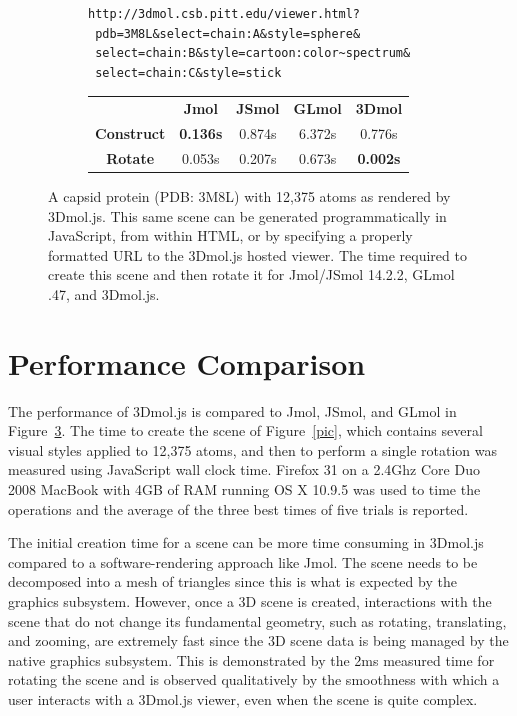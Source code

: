 \documentclass[]{bioinfo}
\begin{document}
\begin{figure}
\begin{minipage}[b]{\linewidth}
\begin{subfigure}[b]{\linewidth} \centering
\begin{verbatim}
http://3dmol.csb.pitt.edu/viewer.html?
 pdb=3M8L&select=chain:A&style=sphere&
 select=chain:B&style=cartoon:color~spectrum&
 select=chain:C&style=stick
\end{verbatim}
\caption{}\label{url}
\end{subfigure}

\begin{subfigure}[b]{\linewidth} \centering
\begin{tabular}{ccccc}
 & \textbf{Jmol} & \textbf{JSmol} & \textbf{GLmol} &\textbf{3Dmol} \\
\textbf{Construct} & \textbf{0.136s} & 0.874s & 6.372s & 0.776s \\
\textbf{Rotate} & 0.053s & 0.207s & 0.673s & \textbf{0.002s} 
\end{tabular}
\caption{}\label{perf}
\end{subfigure}

\end{minipage}
\caption{ A capsid protein (PDB: 3M8L) with 12,375 atoms as rendered by 3Dmol.js.
This same scene can be generated  programmatically in JavaScript,  from
within HTML, or   by specifying a properly formatted URL to the 3Dmol.js hosted viewer.
 The time required to create this scene and then rotate it for Jmol/JSmol 14.2.2, GLmol .47, and 
3Dmol.js.
}
\end{figure}




\section{Performance Comparison}

The performance of 3Dmol.js is compared to Jmol, JSmol, and GLmol in Figure~\ref{perf}.
The time to create the scene of Figure~\ref{pic}, which contains several visual styles applied to 12,375 atoms,
and then to perform a single rotation was measured using JavaScript wall clock time.  Firefox 31 on a 2.4Ghz Core Duo 2008 MacBook with 4GB of RAM running OS X 10.9.5
was used to time the operations and the average of the three best times of five trials is reported.

The initial creation time for a scene can be more time consuming in 3Dmol.js compared to a software-rendering approach like Jmol.
 The scene needs to be decomposed into a mesh of triangles since this is what is expected
by the graphics subsystem.  However, once a 3D scene is created, interactions with the scene that do not change its fundamental geometry,
such as rotating, translating, and zooming, are extremely fast since the 3D scene data is being managed by the native graphics subsystem.
This is demonstrated by the 2ms measured time for rotating the scene and is observed qualitatively by the smoothness with which a user 
 interacts with a 3Dmol.js viewer, even when the scene is quite complex. 
\end{document}
